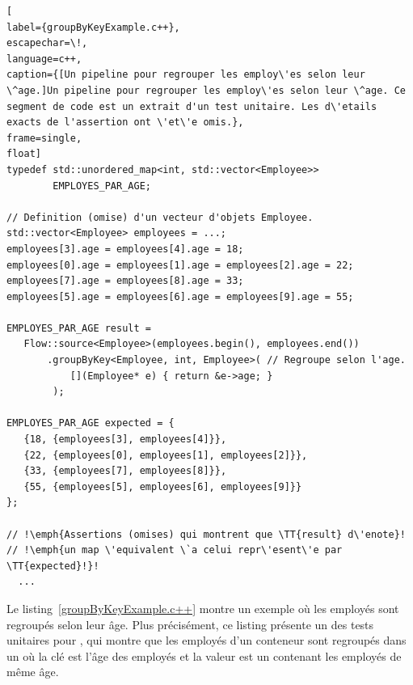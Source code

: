 \begin{lstlisting}[
label={groupByKeyExample.c++},
escapechar=\!,
language=c++,
caption={[Un pipeline pour regrouper les employ\'es selon leur \^age.]Un pipeline pour regrouper les employ\'es selon leur \^age. Ce segment de code est un extrait d'un test unitaire. Les d\'etails exacts de l'assertion ont \'et\'e omis.},
frame=single,
float]
typedef std::unordered_map<int, std::vector<Employee>> 
        EMPLOYES_PAR_AGE;

// Definition (omise) d'un vecteur d'objets Employee.
std::vector<Employee> employees = ...; 
employees[3].age = employees[4].age = 18;
employees[0].age = employees[1].age = employees[2].age = 22;
employees[7].age = employees[8].age = 33;
employees[5].age = employees[6].age = employees[9].age = 55;

EMPLOYES_PAR_AGE result = 
   Flow::source<Employee>(employees.begin(), employees.end())
       .groupByKey<Employee, int, Employee>( // Regroupe selon l'age.
           [](Employee* e) { return &e->age; } 
        );
    
EMPLOYES_PAR_AGE expected = {
   {18, {employees[3], employees[4]}},
   {22, {employees[0], employees[1], employees[2]}},
   {33, {employees[7], employees[8]}},
   {55, {employees[5], employees[6], employees[9]}}
};

// !\emph{Assertions (omises) qui montrent que \TT{result} d\'enote}!
// !\emph{un map \'equivalent \`a celui repr\'esent\'e par \TT{expected}!}!
  ...
\end{lstlisting}




Le listing~\ref{groupByKeyExample.c++} montre un exemple o\`u les employ\'es sont regroup\'es selon leur \^age. Plus pr\'ecis\'ement, ce listing pr\'esente un des tests unitaires pour , qui montre que les employ\'es d'un conteneur sont regroup\'es dans un  o\`u la cl\'e est l'\^age des employ\'es et la valeur est un  contenant les employ\'es de m\^eme \^age.
%

